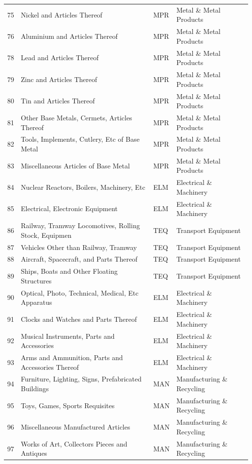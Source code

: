 \documentclass[a4paper]{article}
\begin{document}
\begin{table}[ht]
{\begin{tabular}{rlll}
  75 & Nickel and Articles Thereof & MPR & Metal \& Metal Products \\ 
  76 & Aluminium and Articles Thereof & MPR & Metal \& Metal Products \\ 
  78 & Lead and Articles Thereof & MPR & Metal \& Metal Products \\ 
  79 & Zinc and Articles Thereof & MPR & Metal \& Metal Products \\ 
  80 & Tin and Articles Thereof & MPR & Metal \& Metal Products \\ 
  81 & Other Base Metals, Cermets, Articles Thereof & MPR & Metal \& Metal Products \\ 
  82 & Tools, Implements, Cutlery, Etc of Base Metal & MPR & Metal \& Metal Products \\ 
  83 & Miscellaneous Articles of Base Metal & MPR & Metal \& Metal Products \\ 
  84 & Nuclear Reactors, Boilers, Machinery, Etc & ELM & Electrical \& Machinery \\ 
  85 & Electrical, Electronic Equipment & ELM & Electrical \& Machinery \\ 
  86 & Railway, Tramway Locomotives, Rolling Stock, Equipmen & TEQ & Transport Equipment \\ 
  87 & Vehicles Other than Railway, Tramway & TEQ & Transport Equipment \\ 
  88 & Aircraft, Spacecraft, and Parts Thereof & TEQ & Transport Equipment \\ 
  89 & Ships, Boats and Other Floating Structures & TEQ & Transport Equipment \\ 
  90 & Optical, Photo, Technical, Medical, Etc Apparatus & ELM & Electrical \& Machinery \\ 
  91 & Clocks and Watches and Parts Thereof & ELM & Electrical \& Machinery \\ 
  92 & Musical Instruments, Parts and Accessories & ELM & Electrical \& Machinery \\ 
  93 & Arms and Ammunition, Parts and Accessories Thereof & ELM & Electrical \& Machinery \\ 
  94 & Furniture, Lighting, Signs, Prefabricated Buildings & MAN & Manufacturing \& Recycling \\ 
  95 & Toys, Games, Sports Requisites & MAN & Manufacturing \& Recycling \\ 
  96 & Miscellaneous Manufactured Articles & MAN & Manufacturing \& Recycling \\ 
  97 & Works of Art, Collectors Pieces and Antiques & MAN & Manufacturing \& Recycling \\ 

\end{tabular}}
\end{table}
\end{document}
